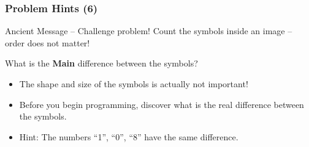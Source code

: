 \begin{frame}
  \frametitle{Problem Hints (6)}
  \begin{block}{Ancient Message -- Challenge problem!}
    Count the symbols inside an image -- order does not matter!

    \bigskip

    What is the {\bf Main} difference between the symbols?
  \end{block}
    
  \begin{itemize}
  \item The shape and size of the symbols is actually not important!
  \item Before you begin programming, discover what is the real
    difference between the symbols.
  \item Hint: The numbers ``1'', ``0'', ``8'' have the same difference.
  \end{itemize}    
\end{frame}
